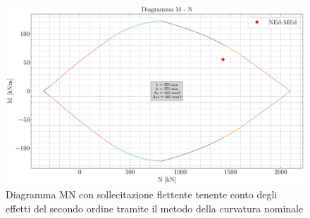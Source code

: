 \begin{figure}[H]
    \centering
    \includegraphics[width=\textwidth]{IMG/M_N_diagram_pilastro_secondo_ordine.pdf}
    \caption{Diagramma MN con sollecitazione flettente tenente conto degli effetti del secondo ordine tramite il metodo della curvatura nominale}
    \label{fig:MN_diagram_secondo_ordine}
\end{figure}